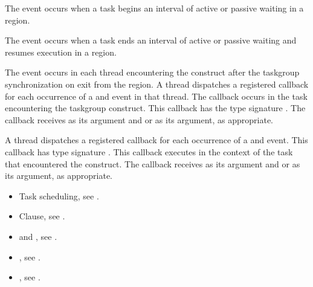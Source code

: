 The  event occurs when a task begins an interval of active or passive waiting
in a  region.

The  event occurs when a task ends an interval of active or passive waiting
and resumes execution in a  region.

The  event occurs in each thread encountering the
 construct after the taskgroup synchronization on exit from the
 region.
\tools
A thread dispatches a registered 
callback for each occurrence of a  and  event
in that thread.  The callback occurs in the task encountering
the taskgroup construct.  This callback has the type signature
.
The callback receives
 as its  argument and
 or 
as its  argument, as appropriate.

A thread dispatches a registered
 callback
for each occurrence of a  and  event.
This callback has type signature .
This callback executes in the context of the task that encountered the
 construct. The callback receives
 as its  argument and
 or 
as its  argument, as appropriate.

\crossreferences
\begin{itemize}
\item Task scheduling, see
.
\item {} Clause, see .

\item {} and , see
.

\item {}, see
.

\item {}, see
.

\end{itemize}










